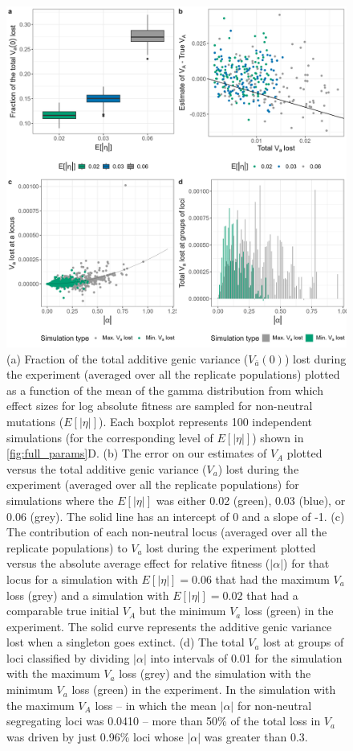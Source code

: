\documentclass[12pt]{article}
\begin{document}
\begin{bibunit}
\begin{figure}[p]
\begin{center}
\includegraphics[scale = 0.11]{Figures/lost_va.jpg}
\end{center}
\caption{(a) Fraction of the total additive genic variance ($V_{\bar a}(0)$) lost during the experiment (averaged over all the replicate populations) plotted as a function of the mean of the gamma distribution from which effect sizes for log absolute fitness are sampled for non-neutral mutations ($E[|\eta|]$). Each boxplot represents 100 independent simulations (for the corresponding level of $E[|\eta|]$) shown in \ref{fig:full_params}D. (b) The error on our estimates of $V_A$ plotted versus the total additive genic variance ($V_a$) lost during the experiment (averaged over all the replicate populations) for simulations where the $E[|\eta|]$ was either 0.02 (green), 0.03 (blue), or 0.06 (grey). The solid line has an intercept of 0 and a slope of -1. (c) The contribution of each non-neutral locus (averaged over all the replicate populations) to $V_a$ lost during the experiment plotted versus the absolute average effect for relative fitness ($|\alpha|$) for that locus for a simulation with $E[|\eta|] = 0.06$ that had the maximum $V_a$ loss (grey) and a simulation with $E[|\eta|] = 0.02$ that had a comparable true initial $V_A$ but the minimum $V_a$ loss (green) in the experiment. The solid curve represents the additive genic variance lost when a singleton goes extinct. (d) The total $V_a$ lost at groups of loci classified by dividing $|\alpha|$ into intervals of 0.01 for the simulation with the maximum $V_a$ loss (grey) and the simulation with the minimum $V_a$ loss (green) in the experiment. In the simulation with the maximum $V_A$ loss -- in which the mean $|\alpha|$ for non-neutral segregating loci was 0.0410 -- more than 50\% of the total loss in $V_a$ was driven by just 0.96\% loci whose $|\alpha|$ was greater than 0.3.}
  \label{fig:lost_va}
\end{figure}


\end{bibunit}
\end{document}
